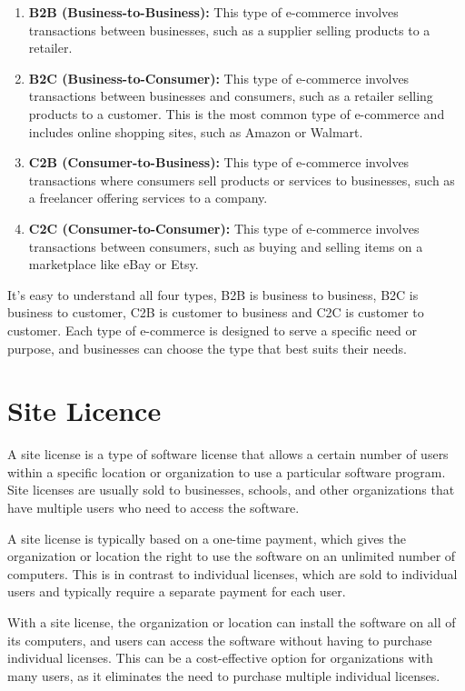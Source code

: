 \documentclass[twocolumn, 12pt, a4paper]{article}
\begin{document}
\begin{enumerate}
  \item \textbf{B2B (Business-to-Business):} This type of e-commerce involves
    transactions between businesses, such as a supplier selling products to a
    retailer.
  \item \textbf{B2C (Business-to-Consumer):} This type of e-commerce involves
    transactions between businesses and consumers, such as a retailer selling
    products to a customer. This is the most common type of e-commerce and
    includes online shopping sites, such as Amazon or Walmart.
  \item \textbf{C2B (Consumer-to-Business):} This type of e-commerce involves
    transactions where consumers sell products or services to businesses, such
    as a freelancer offering services to a company.
  \item \textbf{C2C (Consumer-to-Consumer):} This type of e-commerce involves
    transactions between consumers, such as buying and selling items on a
    marketplace like eBay or Etsy.
\end{enumerate}

It's easy to understand all four types, B2B is business to business, B2C is
business to customer, C2B is customer to business and C2C is customer to
customer. Each type of e-commerce is designed to serve a specific need or
purpose, and businesses can choose the type that best suits their needs.

\section{Site Licence}
A site license is a type of software license that allows a certain number of
users within a specific location or organization to use a particular software
program. Site licenses are usually sold to businesses, schools, and other
organizations that have multiple users who need to access the software.

A site license is typically based on a one-time payment, which gives the
organization or location the right to use the software on an unlimited number
of computers. This is in contrast to individual licenses, which are sold to
individual users and typically require a separate payment for each user.

With a site license, the organization or location can install the software on
all of its computers, and users can access the software without having to
purchase individual licenses. This can be a cost-effective option for
organizations with many users, as it eliminates the need to purchase multiple
individual licenses.
\end{document}
